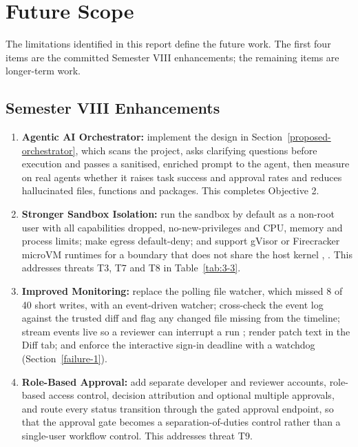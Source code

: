 \documentclass[12pt,a4paper,oneside]{report}
\providecommand{\tightlist}{\setlength{\itemsep}{0pt}\setlength{\parskip}{0pt}}
\begin{document}
\clearpage

\chapter{Future Scope}\label{future-scope}

The limitations identified in this report define the future work. The first four items are the committed Semester VIII enhancements; the remaining items are longer-term work.

\section{Semester VIII Enhancements}\label{sem8-enhancements}

\begin{enumerate}
\def\labelenumi{\arabic{enumi}.}
\tightlist
\item
  \textbf{Agentic AI Orchestrator:} implement the design in Section~\ref{proposed-orchestrator}, which scans the project, asks clarifying questions before execution and passes a sanitised, enriched prompt to the agent, then measure on real agents whether it raises task success and approval rates and reduces hallucinated files, functions and packages. This completes Objective 2.
\item
  \textbf{Stronger Sandbox Isolation:} run the sandbox by default as a non-root user with all capabilities dropped, no-new-privileges and CPU, memory and process limits; make egress default-deny; and support gVisor or Firecracker microVM runtimes for a boundary that does not share the host kernel \cite{ref12}, \cite{ref13}. This addresses threats T3, T7 and T8 in Table~\ref{tab:3-3}.
\item
  \textbf{Improved Monitoring:} replace the polling file watcher, which missed 8 of 40 short writes, with an event-driven watcher; cross-check the event log against the trusted diff and flag any changed file missing from the timeline; stream events live so a reviewer can interrupt a run \cite{ref9}; render patch text in the Diff tab; and enforce the interactive sign-in deadline with a watchdog (Section~\ref{failure-1}).
\item
  \textbf{Role-Based Approval:} add separate developer and reviewer accounts, role-based access control, decision attribution and optional multiple approvals, and route every status transition through the gated approval endpoint, so that the approval gate becomes a separation-of-duties control rather than a single-user workflow control. This addresses threat T9.
\end{enumerate}
\end{document}
